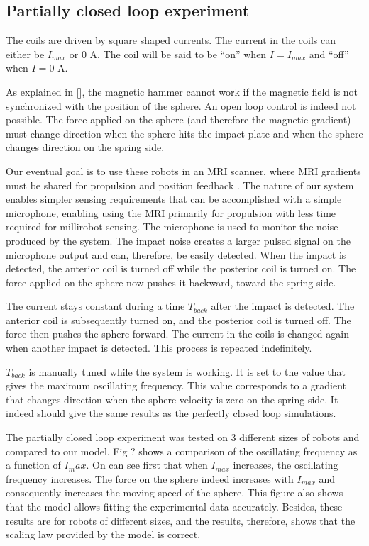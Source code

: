 \documentclass[letterpaper, 10 pt, conference]{ieeeconf}  %
\begin{document}
\subsection{Partially closed loop experiment}

The coils are driven by square shaped currents. The current in the coils can either be $I_{max}$ or 0 A. The coil will be said to be “on” when $I=I_{max}$ and “off” when $I=0$ A.\par
As explained in [], the magnetic hammer cannot work if the magnetic field is not synchronized with the position of the sphere. An open loop control is indeed not possible. The force applied on the sphere (and therefore the magnetic gradient) must change direction when the sphere hits the impact plate and when the sphere changes direction on the spring side.\par
Our eventual goal is to use these robots in an MRI scanner, where MRI gradients must be shared for propulsion and position feedback \cite{578}. The nature of our system enables simpler sensing requirements that can be accomplished with a simple microphone, enabling using the MRI primarily for propulsion with less time required for millirobot sensing. The microphone is used to monitor the noise produced by the system. The impact noise creates a larger pulsed signal on the microphone output and can, therefore, be easily detected. When the impact is detected, the anterior coil is turned off while the posterior coil is turned on. The force applied on the sphere now pushes it backward, toward the spring side.\par
The current stays constant during a time $T_{back}$ after the impact is detected. The anterior coil is subsequently turned on, and the posterior coil is turned off. The force then pushes the sphere forward. The current in the coils is changed again when another impact is detected. This process is repeated indefinitely.\par
$T_{back}$ is manually tuned while the system is working. It is set to the value that gives the maximum oscillating frequency. This value corresponds to a gradient that changes direction when the sphere velocity is zero on the spring side. It indeed should give the same results as the perfectly closed loop simulations.\par
The partially closed loop experiment was tested on 3 different sizes of robots and compared to our model. Fig ? shows a comparison of the oscillating frequency as a function of $I_max$. On can see first that when $I_{max}$ increases, the oscillating frequency increases. The force on the sphere indeed increases with $I_{max}$ and consequently increases the moving speed of the sphere.
This figure also shows that the model allows fitting the experimental data accurately. Besides, these results are for robots of different sizes, and the results, therefore, shows that the scaling law provided by the model is correct.
\end{document}
